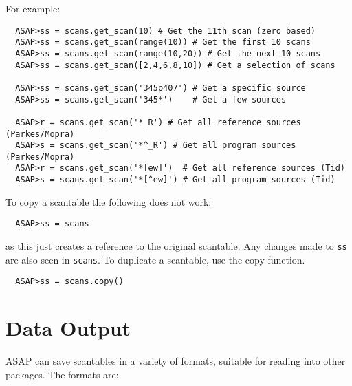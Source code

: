 \documentclass[11pt]{article}
\newcommand{\cmd}[1]{{\tt #1}}
\begin{document}
For example:

\begin{verbatim}
  ASAP>ss = scans.get_scan(10) # Get the 11th scan (zero based)
  ASAP>ss = scans.get_scan(range(10)) # Get the first 10 scans
  ASAP>ss = scans.get_scan(range(10,20)) # Get the next 10 scans
  ASAP>ss = scans.get_scan([2,4,6,8,10]) # Get a selection of scans

  ASAP>ss = scans.get_scan('345p407') # Get a specific source
  ASAP>ss = scans.get_scan('345*')    # Get a few sources

  ASAP>r = scans.get_scan('*_R') # Get all reference sources (Parkes/Mopra)
  ASAP>s = scans.get_scan('*^_R') # Get all program sources (Parkes/Mopra)
  ASAP>r = scans.get_scan('*[ew]')  # Get all reference sources (Tid)
  ASAP>s = scans.get_scan('*[^ew]') # Get all program sources (Tid)

\end{verbatim}

To copy a scantable the following does not work:

\begin{verbatim}
  ASAP>ss = scans
\end{verbatim}

as this just creates a reference to the original scantable. Any
changes made to \cmd{ss} are also seen in \cmd{scans}. To duplicate a
scantable, use the copy function.

\begin{verbatim}
  ASAP>ss = scans.copy()
\end{verbatim}

\section{Data Output}

ASAP can save scantables in a
variety of formats, suitable for reading into other packages. The
formats are:
\end{document}

